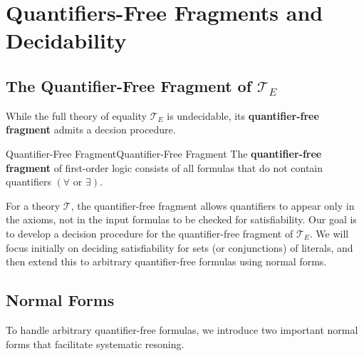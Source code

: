 \documentclass[a4paper]{article}
\theoremstyle{definition}
\begin{document}
\section{Quantifiers-Free Fragments and Decidability}
\subsection{The Quantifier-Free Fragment of \( \mathcal{T}_{E} \)}
While the full theory of equality \( \mathcal{T}_{E} \) is undecidable, its \textbf{quantifier-free fragment} admits a decsion procedure.
\begin{definition}{Quantifier-Free Fragment}{Quantifier-Free Fragment}
The \textbf{quantifier-free fragment} of first-order logic consists of all formulas that do not contain quantifiers \( (\forall \text{ or } \exists) \).
\end{definition}
\vspace{1em}
\noindent
\newline
For a theory \( \mathcal{T} \), the quantifier-free fragment allows quantifiers to appear only in the axioms, not in the 
input formulas to be checked for satisfiability.
\vspace{1em}
\noindent
\newline
Our goal is to develop a decision procedure for the quantifier-free fragment of \( \mathcal{T}_{E} \). We will focus 
initially on deciding satisfiability for sets (or conjunctions) of literals, and then extend this to arbitrary quantifier-free formulas 
using normal forms.
\subsection{Normal Forms}
To handle arbitrary quantifier-free formulas, we introduce two important normal forms that facilitate systematic resoning.
\end{document}
